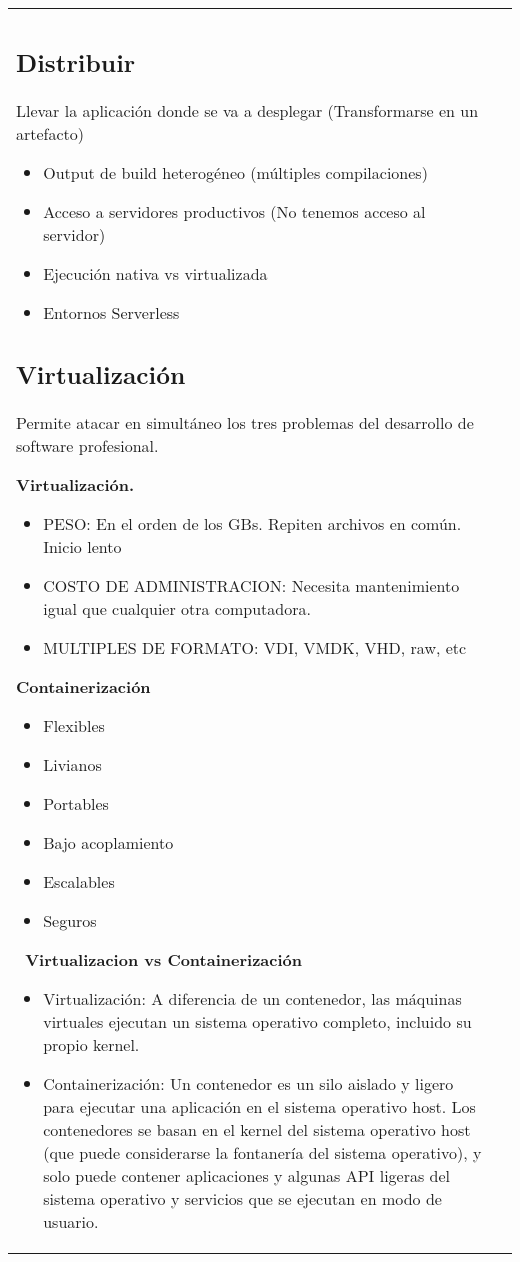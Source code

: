 \documentclass[letterpaper,11pt]{article}
\begin{document}
\begin{tabular*}{7in}{l@{\extracolsep{\fill}}r}
    \subsection{Distribuir}
    Llevar la aplicación donde se va a desplegar (Transformarse en un artefacto)
    
    \begin{itemize}
        \item Output de build heterogéneo (múltiples compilaciones)
        \item Acceso a servidores productivos (No tenemos acceso al servidor)
        \item Ejecución nativa vs virtualizada
        \item Entornos Serverless
    \end{itemize}
    
    \subsection{Virtualización}
    
    Permite atacar en simultáneo los tres problemas del desarrollo de software profesional.\par
    
    {\bf Virtualización.}\par
    \begin{itemize}
        \item PESO: En el orden de los GBs. Repiten archivos en común. Inicio lento
        \item COSTO DE ADMINISTRACION: Necesita mantenimiento igual que cualquier otra computadora.
        \item MULTIPLES DE FORMATO: VDI, VMDK, VHD, raw, etc
    \end{itemize}
    
    {\bf Containerización}\par
    \begin{itemize}
        \item Flexibles
        \item Livianos
        \item Portables
        \item Bajo acoplamiento
        \item Escalables
        \item Seguros
    \end{itemize}
    
    {\bf\ Virtualizacion vs Containerización}
    \begin{itemize}
        \item Virtualización: A diferencia de un contenedor, las máquinas virtuales ejecutan un sistema operativo completo, incluido su propio kernel.
        \item Containerización: Un contenedor es un silo aislado y ligero para ejecutar una aplicación en el sistema operativo host. Los contenedores se basan en el kernel del sistema operativo host (que puede considerarse la fontanería del sistema operativo), y solo puede contener aplicaciones y algunas API ligeras del sistema operativo y servicios que se ejecutan en modo de usuario.
    \end{itemize}
    

\end{tabular*}
\end{document}
